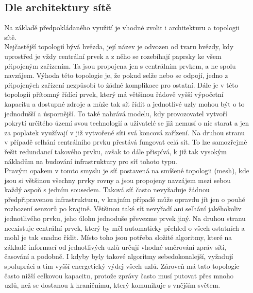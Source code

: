 \documentclass{ctuthesis}
\begin{document}
\subsection{Dle architektury sítě}
Na základě předpokládaného využití je vhodné zvolit i architekturu a topologii sítě.\\
Nejčastější topologií bývá hvězda, její název je odvozen od tvaru hvězdy, kdy uprostřed je vždy centrální prvek a z něho se rozebíhají paprsky ke všem připojeným zařízením. Ta jsou propojena jen s centrálním prvkem, a ne spolu navzájem.  Výhoda této topologie je, že pokud selže nebo se odpojí, jedno z připojených zařízení nezpůsobí to žádné komplikace pro ostatní.  Dále je v této topologii přítomný řídící prvek, který má většinou řádově vyšší výpočetní kapacitu a dostupné zdroje a může tak síť řídit a jednotlivé uzly mohou být o to jednodušší a úspornější. To také nahrává modelu, kdy provozovatel vytvoří pokrytí určitého území svou technologií a uživatelé se již nemusí o nic starat a jen za poplatek využívají v již vytvořené síti svá koncová zařízení. Na druhou stranu v případě selhání centrálního prvku přestává fungovat celá sít. To lze samozřejmě řešit redundancí takového prvku, avšak to dále přispívá, k již tak vysokým nákladům na budování infrastruktury pro síť tohoto typu.\\
Pravým opakem v tomto smyslu je síť postavená na smíšené topologii (mesh), kde jsou si většinou všechny prvky rovny a jsou propojeny navzájem mezi sebou každý aspoň s jedním sousedem.  Taková síť často nevyžaduje žádnou předpřipravenou infrastrukturu, v krajním případě může opravdu jít jen o pouhé rozhození senzorů po krajině. Většinou také síť nevyřadí ani selhání jakéhokoliv jednotlivého prvku, jeho úlohu jednoduše převezme prvek jiný. Na druhou stranu neexistuje centrální prvek, který by měl automaticky přehled o všech ostatních a mohl je tak snadno řídit. Místo toho jsou potřeba složité algoritmy, které na základě informací od jednotlivých uzlů určují vhodné směrování zpráv síti, časování a podobně. I kdyby byly takové algoritmy sebedokonalejší, vyžadují spolupráci a tím vyšší energetický výdej všech uzlů. Zároveň má tato topologie často nižší celkovou kapacitu, protože zprávy často musí putovat přes mnoho uzlů, než se dostanou k hraničnímu, který komunikuje s vnějším světem.
\end{document}
